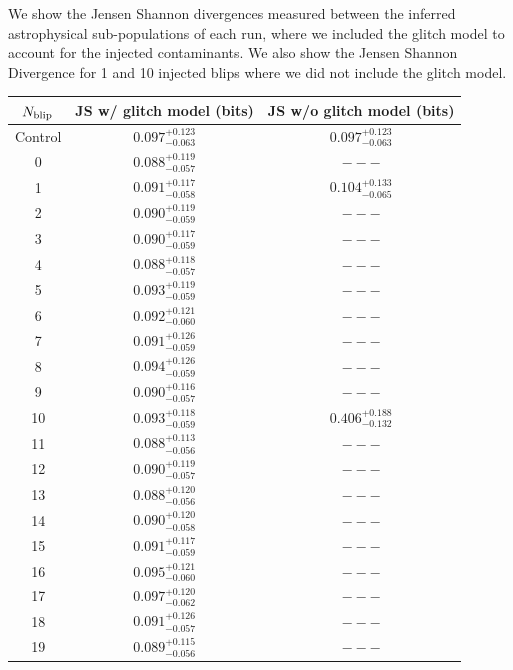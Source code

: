 \begin{refsection}
We show the Jensen Shannon divergences measured between the inferred astrophysical sub-populations of each run, where we included the glitch model to account for the injected contaminants. We also show the Jensen Shannon Divergence for 1 and 10 injected blips where we did not include the glitch model. \renewcommand{\arraystretch}{1.5}
\begin{table}
    \centering
    \begin{tabular}{|c|c|c|}
    \hline
        $N_{\rm blip}$ & JS w/ glitch model (bits) & JS w/o glitch model (bits) \\
        \hline Control & $0.097^{+0.123}_{-0.063}$ & $0.097^{+0.123}_{-0.063}$ \\ \hline 
 	0 & $0.088^{+0.119}_{-0.057}$ & $---$ \\ \hline 
 	1 & $0.091^{+0.117}_{-0.058}$ & $0.104^{+0.133}_{-0.065}$ \\ \hline 
 	2 & $0.090^{+0.119}_{-0.059}$ & $---$ \\ \hline 
 	3 & $0.090^{+0.117}_{-0.059}$ & $---$ \\ \hline 
 	4 & $0.088^{+0.118}_{-0.057}$ & $---$ \\ \hline 
 	5 & $0.093^{+0.119}_{-0.059}$ & $---$ \\ \hline 
 	6 & $0.092^{+0.121}_{-0.060}$ & $---$ \\ \hline 
 	7 & $0.091^{+0.126}_{-0.059}$ & $---$ \\ \hline 
 	8 & $0.094^{+0.126}_{-0.059}$ & $---$ \\ \hline 
 	9 & $0.090^{+0.116}_{-0.057}$ & $---$ \\ \hline 
 	10 & $0.093^{+0.118}_{-0.059}$ & $0.406^{+0.188}_{-0.132}$ \\ \hline 
 	11 & $0.088^{+0.113}_{-0.056}$ & $---$ \\ \hline 
 	12 & $0.090^{+0.119}_{-0.057}$ & $---$ \\ \hline 
 	13 & $0.088^{+0.120}_{-0.056}$ & $---$ \\ \hline 
 	14 & $0.090^{+0.120}_{-0.058}$ & $---$ \\ \hline 
 	15 & $0.091^{+0.117}_{-0.059}$ & $---$ \\ \hline 
 	16 & $0.095^{+0.121}_{-0.060}$ & $---$ \\ \hline 
 	17 & $0.097^{+0.120}_{-0.062}$ & $---$ \\ \hline 
 	18 & $0.091^{+0.126}_{-0.057}$ & $---$ \\ \hline 
 	19 & $0.089^{+0.115}_{-0.056}$ & $---$ \\ \hline 

\end{tabular}
\end{table}
\end{refsection}
